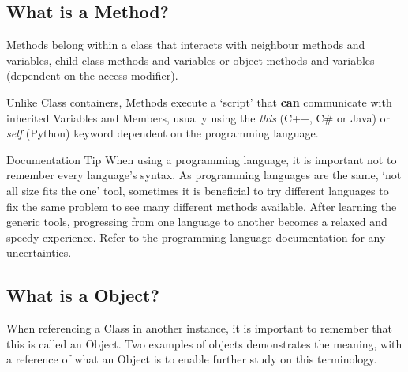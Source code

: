 \documentclass[10pt]{article}
\begin{document}
    \subsection{What is a Method?}
        Methods belong within a class that interacts with neighbour methods and variables, child class methods and variables or object methods and variables (dependent on the access modifier).
        
        Unlike Class containers, Methods execute a `script' that \textbf{can} communicate with inherited Variables and Members, usually using the \textit{this} (C++, C\# or Java) or \textit{self} (Python) keyword dependent on the programming language.

        \begin{tip}{Documentation Tip}
            When using a programming language, it is important not to remember every language's syntax. As programming languages are the same, `not all size fits the one' tool, sometimes it is beneficial to try different languages to fix the same problem to see many different methods available. After learning the generic tools, progressing from one language to another becomes a relaxed and speedy experience. Refer to the programming language documentation for any uncertainties.
        \end{tip}

    \subsection{What is a Object?}
        When referencing a Class in another instance, it is important to remember that this is called an Object. Two examples of objects demonstrates the meaning, with a reference of what an Object is to enable further study on this terminology.
\end{document}
